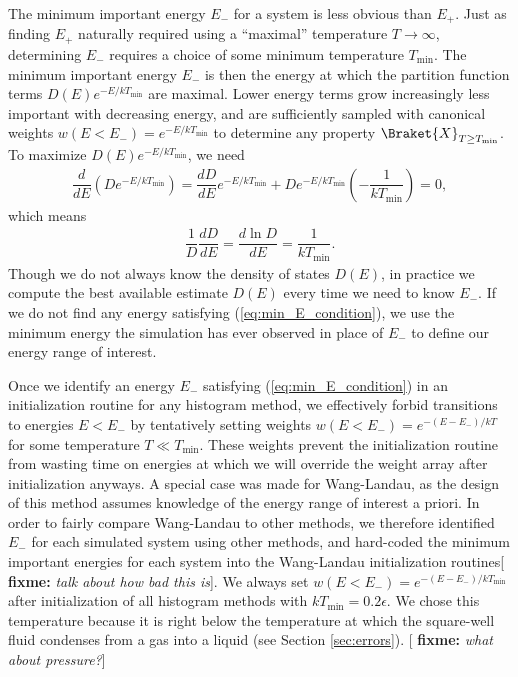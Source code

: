 \documentclass[11pt]{article}
\newcommand{\bk}{\Braket} %
\renewcommand{\t}{\text} %
\newcommand{\f}[2]{\dfrac{#1}{#2}} %
\newcommand{\p}[1]{\left(#1\right)} %
\newcommand{\red}[1]{{\bf \color{red} #1}}
\newcommand{\fixme}[1]{[\red{fixme:} \emph{#1}]}
\begin{document}
The minimum important energy $E_-$ for a system is less obvious than
$E_+$. Just as finding $E_+$ naturally required using a ``maximal''
temperature $T\to\infty$, determining $E_-$ requires a choice of some
minimum temperature $T_{\t{min}}$. The minimum important energy $E_-$
is then the energy at which the partition function terms
$D\p{E}e^{-E/kT_{\t{min}}}$ are maximal. Lower energy terms grow
increasingly less important with decreasing energy, and are
sufficiently sampled with canonical weights
$w\p{E<E_-}=e^{-E/kT_{\t{min}}}$ to determine any property
$\bk{X}_{T\ge T_{\t{min}}}$. To maximize $D\p{E}e^{-E/kT_{\t{min}}}$,
we need
\begin{align}
  \f{d}{dE}\p{De^{-E/kT_{\t{min}}}}
  =\f{dD}{dE}e^{-E/kT_{\t{min}}}+De^{-E/kT_{\t{min}}}\p{-\f{1}{kT_{\t{min}}}}=0,
  \label{eq:min_E_setup}
\end{align}
which means
\begin{align}
  \f1{D}\f{dD}{dE}=\f{d\ln D}{dE}=\f{1}{kT_{\t{min}}}.
  \label{eq:min_E_condition}
\end{align}
Though we do not always know the density of states $D\p{E}$, in
practice we compute the best available estimate $D\p{E}$ every time we
need to know $E_-$. If we do not find any energy satisfying
(\ref{eq:min_E_condition}), we use the minimum energy the simulation
has ever observed in place of $E_-$ to define our energy range of
interest.

Once we identify an energy $E_-$ satisfying (\ref{eq:min_E_condition})
in an initialization routine for any histogram method, we effectively
forbid transitions to energies $E<E_-$ by tentatively setting weights
$w\p{E<E_-}=e^{-\p{E-E_-}/kT}$ for some temperature $T\ll
T_{\t{min}}$. These weights prevent the initialization routine from
wasting time on energies at which we will override the weight array
after initialization anyways. A special case was made for Wang-Landau,
as the design of this method assumes knowledge of the energy range of
interest a priori. In order to fairly compare Wang-Landau to other
methods, we therefore identified $E_-$ for each simulated system using
other methods, and hard-coded the minimum important energies for each
system into the Wang-Landau initialization routines\fixme{talk about
  how bad this is}. We always set
$w\p{E<E_-}=e^{-\p{E-E_-}/kT_{\t{min}}}$ after initialization of all
histogram methods with $kT_{\t{min}}=0.2\epsilon$. We chose this
temperature because it is right below the temperature at which the
square-well fluid condenses from a gas into a liquid (see Section
\ref{sec:errors}). \fixme{what about pressure?}
\end{document}
